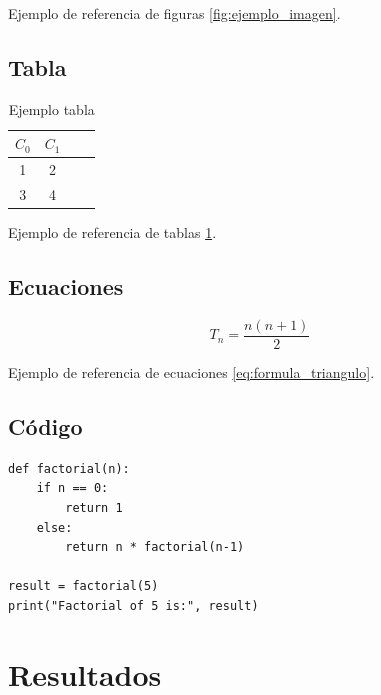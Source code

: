 \documentclass[12pt,letterpaper]{article}
\begin{document}
Ejemplo de referencia de figuras \ref{fig:ejemplo_imagen}.

\subsection{Tabla}

\begin{table}[H]
\caption{Ejemplo tabla} \label{tab:ejemplo_tabla}
    \begin{center}
    	\begin{tabular}{@{}*{4}{c}@{}}
            \toprule
            $C_0$ & $C_1$\\
            \midrule
            1 & 2\\
        	3 & 4\\
        	\bottomrule
        \end{tabular}
    \end{center}
\end{table}

Ejemplo de referencia de tablas \ref{tab:ejemplo_tabla}.

\subsection{Ecuaciones}

\begin{equation} \label{eq:formula_triangulo}
    T_n = \frac{n(n+1)}{2}
\end{equation}

Ejemplo de referencia de ecuaciones \eqref{eq:formula_triangulo}.

\subsection{Código}

\begin{lstlisting}[style=mystyle, caption={Ejemplo de codigo}, label=lst:ejemplo_codigo]
def factorial(n):
    if n == 0:
        return 1
    else:
        return n * factorial(n-1)

result = factorial(5)
print("Factorial of 5 is:", result)
\end{lstlisting}


\section{Resultados}
\end{document}
